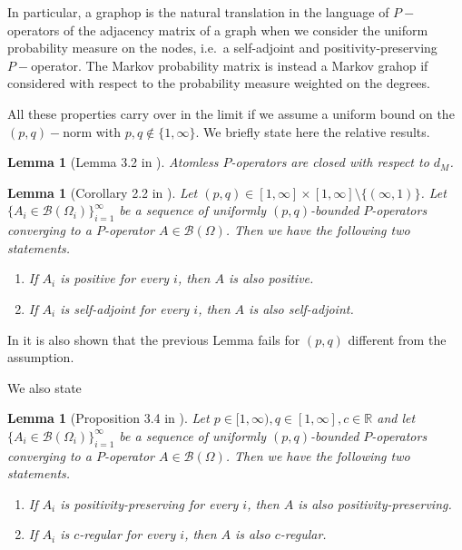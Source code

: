 \documentclass[11pt]{article}
\newtheorem{lemma}[theorem]{Lemma}
\begin{document}
In particular, a graphop is the natural translation in the language of $P-$operators of the adjacency matrix of a graph when we consider the uniform probability measure on the nodes, i.e.\ a self-adjoint and positivity-preserving $P-$operator. The Markov probability matrix is instead a Markov grahop if considered with respect to the probability measure weighted on the degrees.\newline

All these properties carry over in the limit if we assume a uniform bound on the $(p,q)-$norm with $p,q\notin\{1,\infty\}$. We briefly state here the relative results.

\begin{lemma}[Lemma 3.2 in \cite{backhausz2018action}]Atomless $P$-operators are closed with respect to $d_M$.
\end{lemma}

\begin{lemma}[Corollary 2.2 in \cite{ArankaAction2022}]Let $(p,q)\in[1,\infty]\times[1,\infty]\setminus\{(\infty,1)\}$. Let $\{A_i\in\mathcal{B}(\Omega_i)\}_{i=1}^\infty$ be a sequence of uniformly $(p,q)$-bounded  $P$-operators converging to a $P$-operator $A\in\mathcal{B}(\Omega)$. Then we have the following two statements.
\begin{enumerate}
\item If $A_i$ is positive for every $i$, then $A$ is also positive.
\item If $A_i$ is self-adjoint for every $i$, then $A$ is also self-adjoint.
\end{enumerate}
\end{lemma}

In \cite{ArankaAction2022} it is also shown that the previous Lemma fails for $(p,q)$ different from the assumption.

We also state
\begin{lemma}[Proposition 3.4 in \cite{backhausz2018action}] Let $p\in [1,\infty),q\in [1,\infty],c\in\mathbb{R}$ and let $\{A_i\in\mathcal{B}(\Omega_i)\}_{i=1}^\infty$ be a sequence of uniformly $(p,q)$-bounded  $P$-operators converging to a $P$-operator $A\in\mathcal{B}(\Omega)$. Then we have the following two statements.
\begin{enumerate}
\item If $A_i$ is positivity-preserving for every $i$, then $A$ is also positivity-preserving.
\item If $A_i$ is $c$-regular for every $i$, then $A$ is also $c$-regular.
\end{enumerate}
\end{lemma}
\end{document}
